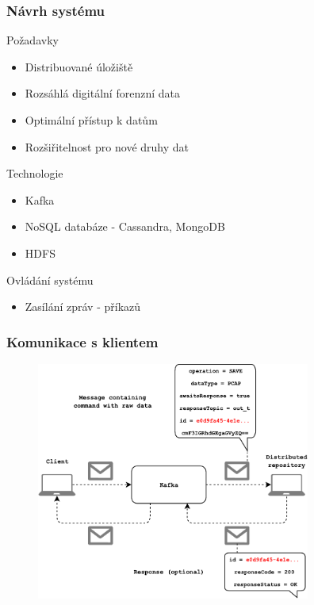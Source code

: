 \documentclass[10pt,xcolor=pdflatex]{beamer}
\begin{document}
\begin{frame}\frametitle{Návrh systému}
\begin{block}{Požadavky}
    \begin{itemize}
        \item Distribuované úložiště
        \item Rozsáhlá digitální forenzní data
        \item Optimální přístup k datům
        \item Rozšiřitelnost pro nové druhy dat
    \end{itemize}
\end{block}
\begin{block}{Technologie}
    \begin{itemize}
        \item Kafka
        \item NoSQL databáze - Cassandra, MongoDB
        \item HDFS
    \end{itemize}
\end{block}
\begin{block}{Ovládání systému}
    \begin{itemize}
        \item Zasílání zpráv - příkazů
    \end{itemize}
\end{block}
\end{frame}


\begin{frame}\frametitle{Komunikace s klientem}
\begin{figure}[!h]
  \centering
  \includegraphics[width=9cm]{img/Kafka_communication.pdf}
  \label{FIG_KafkaCommunication}
\end{figure}
\end{frame}
\end{document}

